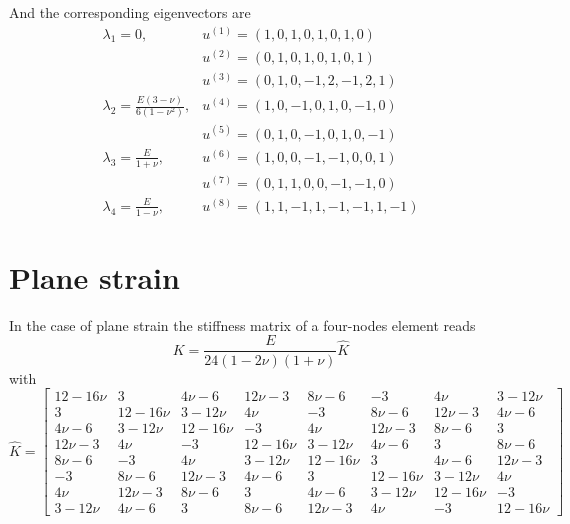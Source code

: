 \documentclass[12pt,letterpaper]{article}
\begin{document}
And the corresponding eigenvectors are
\begin{equation}
\begin{array}{ll}
\lambda_1 = 0, 
	&u^{(1)} = (1, 0, 1, 0, 1, 0, 1, 0)\\
	&u^{(2)} = (0, 1, 0, 1, 0, 1, 0, 1)\\
	&u^{(3)} = (0, 1, 0, -1, 2, -1, 2, 1)\\
\lambda_2 = \frac{E(3 - \nu)}{6(1 - \nu^2)}, 
	&u^{(4)} = (1, 0, -1, 0, 1, 0, -1, 0)\\
	&u^{(5)} = (0, 1, 0, -1, 0, 1, 0, -1)\\
\lambda_3 = \frac{E}{1 + \nu}, 
	&u^{(6)} = (1, 0, 0, -1, -1, 0, 0, 1)\\
	&u^{(7)} = (0, 1, 1, 0, 0, -1, -1, 0)\\
\lambda_4 = \frac{E}{1 - \nu}, 
	&u^{(8)} = (1, 1, -1, 1, -1, -1, 1, -1)
\end{array}
\end{equation}

\section{Plane strain}
In the case of plane strain the stiffness matrix of a four-nodes element reads
\begin{equation}
  K = \frac{E}{24(1 - 2\nu)(1 + \nu)} \hat{K}
\end{equation}
with
\begin{equation}
  \hat{K} = 
  \begin{bmatrix}
    12 - 16\nu & 3 & 4 \nu - 6 & 12 \nu - 3 & 8 \nu - 6 & -3 & 4 \nu & 3 - 12\nu\\
    3 & 12 - 16\nu & 3 - 12\nu & 4 \nu & -3 & 8 \nu - 6 & 12 \nu - 3 & 4 \nu - 6\\4 \nu - 6 & 3 - 12\nu & 12 - 16\nu & -3 & 4 \nu & 12 \nu - 3 & 8 \nu - 6 & 3\\
    12 \nu - 3 & 4 \nu & -3 & 12 - 16\nu & 3 - 12\nu & 4 \nu - 6 & 3 & 8 \nu - 6\\
    8 \nu - 6 & -3 & 4 \nu & 3 - 12\nu & 12 - 16\nu & 3 & 4 \nu - 6 & 12 \nu - 3\\
    -3 & 8 \nu - 6 & 12 \nu - 3 & 4 \nu - 6 & 3 & 12 - 16\nu & 3 - 12\nu & 4 \nu\\4 \nu & 12 \nu - 3 & 8 \nu - 6 & 3 & 4 \nu - 6 & 3 - 12\nu & 12 - 16\nu & -3\\
    3 - 12\nu & 4 \nu - 6 & 3 & 8 \nu - 6 & 12 \nu - 3 & 4 \nu & -3 & 12 - 16\nu
  \end{bmatrix}
\end{equation}
\end{document}
